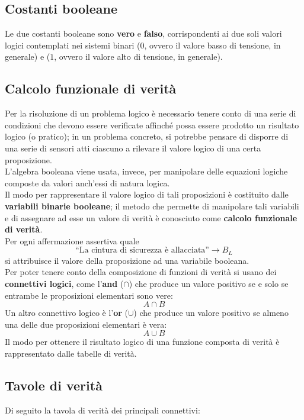 \documentclass[a4paper]{extarticle}
\newcommand{\quotes}[1]{``#1''}
\begin{document}
\subsection{Costanti booleane}
Le due costanti booleane sono \textbf{vero} e \textbf{falso}, corrispondenti ai due soli valori logici contemplati nei sistemi binari (\(0\), ovvero il valore basso di tensione, in generale) e (\(1\), ovvero il valore alto di tensione, in generale).

\subsection{Calcolo funzionale di verità}
Per la risoluzione di un problema logico è necessario tenere conto di una serie di condizioni che devono essere verificate affinché possa essere prodotto un risultato logico (o pratico); in un problema concreto, si potrebbe pensare di disporre di una serie di sensori atti ciascuno a rilevare il valore logico di una certa proposizione.\\
L'algebra booleana viene usata, invece, per manipolare delle equazioni logiche composte da valori anch'essi di natura logica.\\
Il modo per rappresentare il valore logico di tali proposizioni è costituito dalle \textbf{variabili binarie booleane}; il metodo che permette di manipolare tali variabili e di assegnare ad esse un valore di verità è conosciuto come \textbf{calcolo funzionale di verità}.\\
Per ogni affermazione assertiva quale
\[\text{\quotes{La cintura di sicurezza è allacciata}} \rightarrow B_{L}\]
si attribuisce il valore della proposizione ad una variabile booleana.\\
Per poter tenere conto della composizione di funzioni di verità si usano dei \textbf{connettivi logici}, come l'\textbf{and} (\(\cap\)) che produce un valore positivo se e solo se entrambe le proposizioni elementari sono vere:
\[A \cap B\]
Un altro connettivo logico è l'\textbf{or} (\(\cup\)) che produce un valore positivo se almeno una delle due proposizioni elementari è vera:
\[A \cup B\]
Il modo per ottenere il risultato logico di una funzione composta di verità è rappresentato dalle tabelle di verità.

\subsection{Tavole di verità}
Di seguito la tavola di verità dei principali connettivi:
\end{document}
